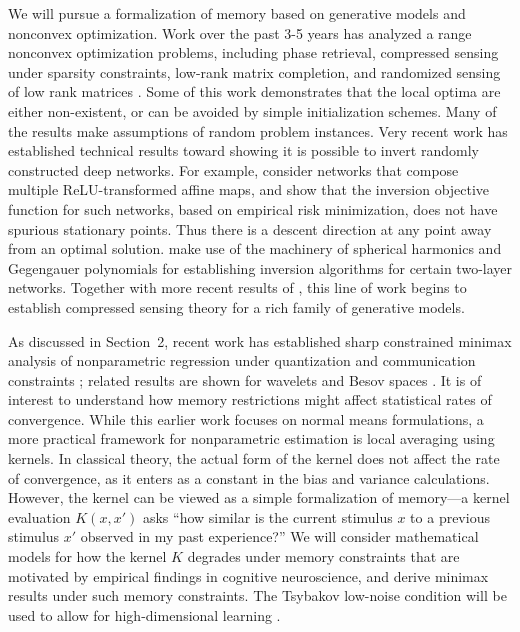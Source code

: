 We will pursue a formalization of memory based on generative models
and nonconvex optimization. Work over the past 3-5 years has analyzed a range nonconvex
optimization problems, including phase retrieval, compressed
sensing under sparsity constraints, low-rank matrix
completion, and randomized sensing of low rank matrices
\cite{phaselift_1,phaselift_2,phaselift_3,ZhaWanLiu15,WeiCaiCha16,ZheLaf15,phaselift_1,phaselift_2,phaselift_3,ZhaWanLiu15,WeiCaiCha16}.
Some of this work demonstrates that the local optima are either
non-existent, or can be avoided by simple initialization schemes. Many
of the results make assumptions of random problem instances.  Very
recent work has established technical results toward showing it is
possible to invert randomly constructed deep networks. For example,
\cite{HandV17} consider networks that compose multiple ReLU-transformed affine
maps, and show that the inversion objective function for such networks, based
on empirical risk minimization, does not have spurious stationary
points. Thus there is a descent direction at any point away from an optimal solution.
\cite{Mixon18} make use of the machinery of spherical harmonics and Gegengauer polynomials for
establishing inversion algorithms for certain two-layer
networks. Together with more recent results of \cite{HandV18}, this
line of work begins to establish compressed sensing theory for a rich
family of generative models.


As discussed in Section~2, recent work has established 
sharp constrained minimax analysis of nonparametric
regression under quantization and communication
constraints \citep{Zhu:18,Zhu:18b}; related results are shown
for wavelets and Besov spaces \citep{szabo18}.
It is of interest to understand how memory restrictions might affect
statistical rates of convergence. While this earlier work focuses on
normal means formulations, a more practical framework for
nonparametric estimation is local averaging using kernels. In
classical theory, the actual form of the kernel does not affect the
rate of convergence, as it enters as a constant in the bias and
variance calculations. However, the kernel can be viewed as a
simple formalization of memory---a kernel evaluation $K(x,x')$ asks
``how similar is the current stimulus $x$ to a previous stimulus $x'$
observed in my past experience?'' We will consider mathematical models for
how the kernel $K$ degrades under memory constraints that
are motivated by empirical findings in cognitive neuroscience,
and derive minimax results under such memory constraints. The
Tsybakov low-noise condition will be used to allow for
high-dimensional learning \citep{mammen1999,tsybakov2004,audibert2007}.



